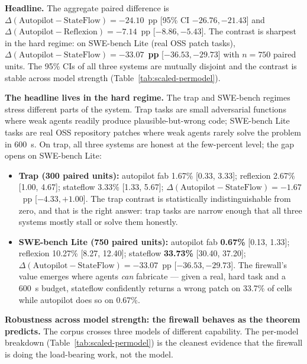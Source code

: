 \textbf{Headline.} The aggregate paired difference is
$\Delta(\text{Autopilot} - \text{StateFlow}) = -24.10$~pp [95\% CI $-26.76, -21.43$]
and $\Delta(\text{Autopilot} - \text{Reflexion}) = -7.14$~pp [$-8.86, -5.43$]. The contrast
is sharpest in the hard regime: on SWE-bench Lite (real OSS patch tasks),
$\Delta(\text{Autopilot} - \text{StateFlow}) = \mathbf{-33.07}$~\textbf{pp} [$-36.53, -29.73$]
with $n=750$ paired units. The 95\% CIs of all three systems are mutually disjoint and the
contrast is stable across model strength (Table~\ref{tab:scaled-permodel}).

\textbf{The headline lives in the hard regime.} The trap and SWE-bench regimes stress
different parts of the system. Trap tasks are small adversarial functions where weak
agents readily produce plausible-but-wrong code; SWE-bench Lite tasks are real OSS
repository patches where weak agents rarely solve the problem in 600~s. On trap, all
three systems are honest at the few-percent level; the gap opens on SWE-bench Lite:

\begin{itemize}\tightlist
\item \textbf{Trap (300 paired units):} autopilot fab 1.67\% [0.33, 3.33];
reflexion 2.67\% [1.00, 4.67]; stateflow 3.33\% [1.33, 5.67];
$\Delta(\text{Autopilot} - \text{StateFlow}) = -1.67$~pp [$-4.33, +1.00$].
The trap contrast is statistically indistinguishable from zero, and that is the
right answer: trap tasks are narrow enough that all three systems mostly stall
or solve them honestly.
\item \textbf{SWE-bench Lite (750 paired units):} autopilot fab \textbf{0.67\%}
[0.13, 1.33]; reflexion 10.27\% [8.27, 12.40]; stateflow \textbf{33.73\%}
[30.40, 37.20]; $\Delta(\text{Autopilot} - \text{StateFlow}) = -33.07$~pp
[$-36.53, -29.73$]. The firewall's value emerges where agents \emph{can}
fabricate --- given a real, hard task and a 600~s budget, stateflow confidently
returns a wrong patch on 33.7\% of cells while autopilot does so on 0.67\%.
\end{itemize}

\textbf{Robustness across model strength: the firewall behaves as the theorem predicts.}
The corpus crosses three models of different capability. The per-model breakdown
(Table~\ref{tab:scaled-permodel}) is the cleanest evidence that the firewall is doing
the load-bearing work, not the model.

